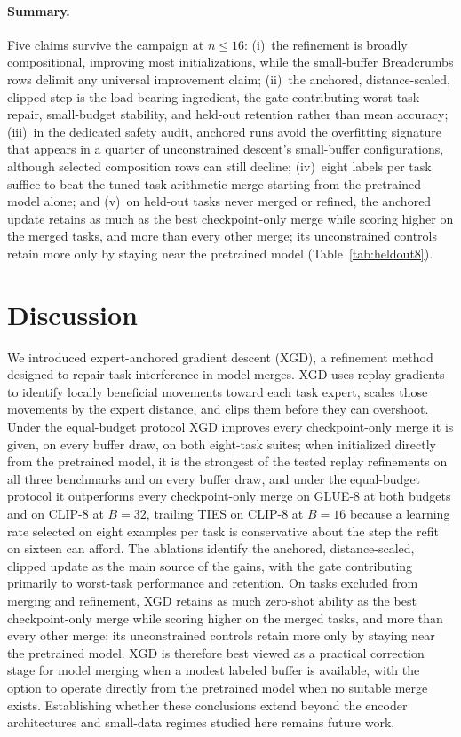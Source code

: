 \documentclass{article} %
\begin{document}
\paragraph{Summary.}
Five claims survive the campaign at $n\le16$: (i)~the refinement is broadly compositional, improving most initializations, while the small-buffer Breadcrumbs rows delimit any universal improvement claim; (ii)~the anchored, distance-scaled, clipped step is the load-bearing ingredient, the gate contributing worst-task repair, small-budget stability, and held-out retention rather than mean accuracy; (iii)~in the dedicated safety audit, anchored runs avoid the overfitting signature that appears in a quarter of unconstrained descent's small-buffer configurations, although selected composition rows can still decline; (iv)~eight labels per task suffice to beat the tuned task-arithmetic merge starting from the pretrained model alone; and (v)~on held-out tasks never merged or refined, the anchored update retains as much as the best checkpoint-only merge while scoring higher on the merged tasks, and more than every other merge; its unconstrained controls retain more only by staying near the pretrained model (Table~\ref{tab:heldout8}).

\section{Discussion}
\label{sec:contribution}

We introduced expert-anchored gradient descent (XGD), a refinement method designed to repair task interference in model merges. XGD uses replay gradients to identify locally beneficial movements toward each task expert, scales those movements by the expert distance, and clips them before they can overshoot. Under the equal-budget protocol XGD improves every checkpoint-only merge it is given, on every buffer draw, on both eight-task suites; when initialized directly from the pretrained model, it is the strongest of the tested replay refinements on all three benchmarks and on every buffer draw, and under the equal-budget protocol it outperforms every checkpoint-only merge on GLUE-8 at both budgets and on CLIP-8 at $B=32$, trailing TIES on CLIP-8 at $B=16$ because a learning rate selected on eight examples per task is conservative about the step the refit on sixteen can afford. The ablations identify the anchored, distance-scaled, clipped update as the main source of the gains, with the gate contributing primarily to worst-task performance and retention. On tasks excluded from merging and refinement, XGD retains as much zero-shot ability as the best checkpoint-only merge while scoring higher on the merged tasks, and more than every other merge; its unconstrained controls retain more only by staying near the pretrained model. XGD is therefore best viewed as a practical correction stage for model merging when a modest labeled buffer is available, with the option to operate directly from the pretrained model when no suitable merge exists. Establishing whether these conclusions extend beyond the encoder architectures and small-data regimes studied here remains future work.
\end{document}
